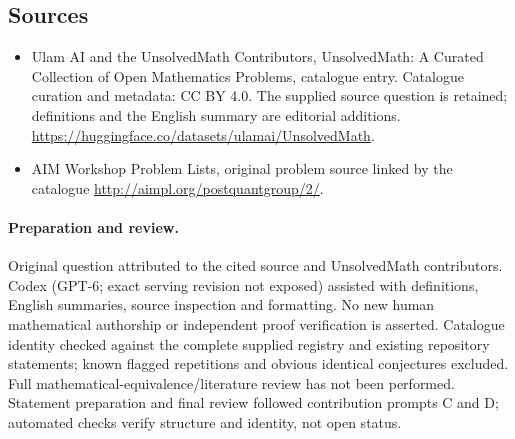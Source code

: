\documentclass[11pt]{article}
\begin{document}
\subsection{Sources}
\begin{itemize}
\item[\hypertarget{source:statement:1}{S1}] Ulam AI and the UnsolvedMath Contributors, UnsolvedMath: A Curated Collection of Open Mathematics Problems, catalogue entry. Catalogue curation and metadata: CC BY 4.0. The supplied source question is retained; definitions and the English summary are editorial additions.
\url{https://huggingface.co/datasets/ulamai/UnsolvedMath}.
\item[\hypertarget{source:statement:2}{S2}] AIM Workshop Problem Lists, original problem source linked by the catalogue
\url{http://aimpl.org/postquantgroup/2/}.
\end{itemize}
\paragraph{Preparation and review.}
Original question attributed to the cited source and UnsolvedMath contributors. Codex (GPT-6; exact serving revision not exposed) assisted with definitions, English summaries, source inspection and formatting. No new human mathematical authorship or independent proof verification is asserted. Catalogue identity checked against the complete supplied registry and existing repository statements; known flagged repetitions and obvious identical conjectures excluded. Full mathematical-equivalence/literature review has not been performed. Statement preparation and final review followed contribution prompts C and D; automated checks verify structure and identity, not open status.
\label{end:statement}
\end{document}
